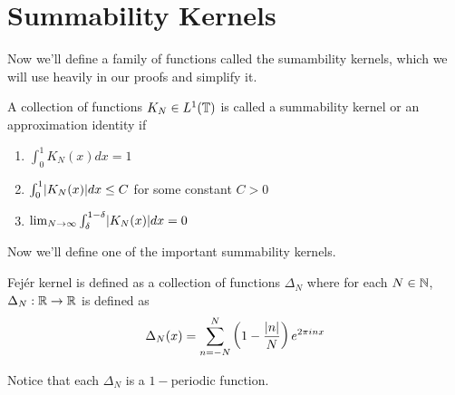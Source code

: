   \section{Summability Kernels}
  Now we'll define a family of functions called the sumambility kernels, which we will use heavily in our proofs and simplify it.
  \begin{definition}
    \label{def:summability_kernel}
    A collection of functions $K_N \in L^1(\mathbb T)$ is called a summability kernel or an approximation identity if 
    \begin{enumerate}[label=(\alph*)]
      \item $\int_{0}^{1}K_N(x)dx = 1$
      \item $\int_{0}^{1}\lvert K_N(x)\rvert dx \le C$ for some constant $C>0$
      \item $\lim_{N\to\infty} \int_{\delta}^{1-\delta}\lvert K_N(x)\rvert dx= 0$
    \end{enumerate}
  \end{definition}
 

  Now we'll define one of the important summability kernels.
  \begin{definition}
    \label{def:fejer_kernel}
    Fej\'er kernel is defined as a collection of functions  $\Delta_N$ where for each $N \in \mathbb N$, $\Delta_N : \mathbb R \to \mathbb R$ is defined as 
    \begin{displaymath}
      \Delta_N(x) = \sum_{n=-N}^{N}\left( 1 - \frac{\lvert n\rvert}{N}\right)e^{2\pi inx}
    \end{displaymath}
  \end{definition}
  Notice that each $\Delta_N$ is a $1-$periodic function.


